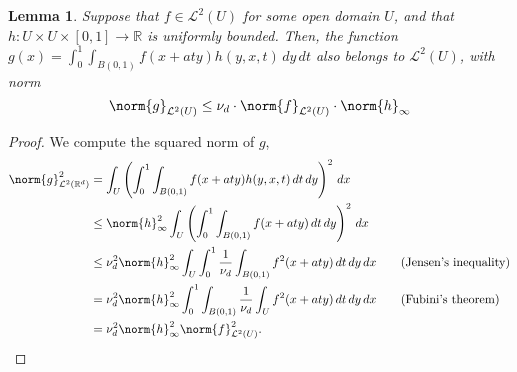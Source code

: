 \documentclass{article}
\newcommand{\Reals}{\mathbb{R}}
\newcommand{\1}{\mathbf{1}}
\newcommand{\Rd}{\Reals^d}
\newcommand{\Leb}{\mathcal{L}}
\theoremstyle{alden}
\theoremstyle{aldenthm}
\newtheorem{lemma}{Lemma}
\theoremstyle{definition}
\theoremstyle{remark}
\begin{document}
\begin{lemma}
	\label{lem:remainder_term}
	Suppose that $f \in \Leb^2(U)$ for some open domain $U$, and that $h:U \times U \times [0,1] \to \Reals$ is uniformly bounded. Then, the function $g(x) = \int_{0}^{1} \int_{B(0,1)} f(x + aty) h(y,x, t) \,dy \,dt$ also belongs to $\Leb^2(U)$, with norm
	\begin{equation*}
	\norm{g}_{\Leb^2(U)} \leq \nu_d \cdot \norm{f}_{\Leb^2(U)} \cdot \norm{h}_{\infty}
	\end{equation*}
\end{lemma}
\begin{proof}
	We compute the squared norm of $g$,
	\begin{align*}
	\norm{g}_{\Leb^2(\Rd)}^2 & = \int_{U} \left(\int_{0}^{1} \int_{B(0,1)} f(x + aty) h(y,x,t) \,dt \,dy \right)^2 \,dx \\
	& \leq \norm{h}_{\infty}^2 \int_{U} \left(\int_{0}^{1} \int_{B(0,1)} f(x + aty) \,dt \,dy \right)^2 \,dx \\
	& \leq \nu_d^2 \norm{h}_{\infty}^2 \int_{U} \int_{0}^{1} \frac{1}{\nu_d}\int_{B(0,1)} f^2(x + aty) \,dt \,dy \,dx \tag{Jensen's inequality} \\
	& = \nu_d^2 \norm{h}_{\infty}^2 \int_{0}^{1} \int_{B(0,1)} \frac{1}{\nu_d}\int_{U}f^2(x + aty) \,dt \,dy \,dx \tag{Fubini's theorem} \\
	& = \nu_d^2 \norm{h}_{\infty}^2 \norm{f}_{\Leb^2(U)}^2.
	\end{align*}
\end{proof}
\end{document}
